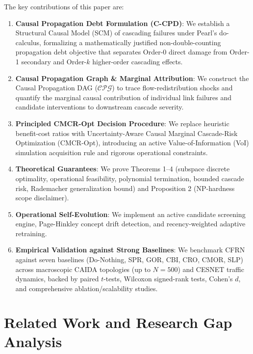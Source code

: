 \documentclass[pdflatex,sn-mathphys-num]{sn-jnl}
\theoremstyle{thmstyleone}
\theoremstyle{thmstyletwo}
\theoremstyle{thmstylethree}
\begin{document}
The key contributions of this paper are:
\begin{enumerate}
    \item \textbf{Causal Propagation Debt Formulation (C-CPD)}: We establish a Structural Causal Model (SCM) of cascading failures under Pearl's do-calculus, formalizing a mathematically justified non-double-counting propagation debt objective that separates Order-0 direct damage from Order-1 secondary and Order-$k$ higher-order cascading effects.
    \item \textbf{Causal Propagation Graph \& Marginal Attribution}: We construct the Causal Propagation DAG ($\mathcal{CPG}$) to trace flow-redistribution shocks and quantify the marginal causal contribution of individual link failures and candidate interventions to downstream cascade severity.
    \item \textbf{Principled CMCR-Opt Decision Procedure}: We replace heuristic benefit-cost ratios with Uncertainty-Aware Causal Marginal Cascade-Risk Optimization (CMCR-Opt), introducing an active Value-of-Information (VoI) simulation acquisition rule and rigorous operational constraints.
    \item \textbf{Theoretical Guarantees}: We prove Theorems 1--4 (subspace discrete optimality, operational feasibility, polynomial termination, bounded cascade risk, Rademacher generalization bound) and Proposition 2 (NP-hardness scope disclaimer).
    \item \textbf{Operational Self-Evolution}: We implement an active candidate screening engine, Page-Hinkley concept drift detection, and recency-weighted adaptive retraining.
    \item \textbf{Empirical Validation against Strong Baselines}: We benchmark CFRN against seven baselines (Do-Nothing, SPR, GOR, CBI, CRO, CMOR, SLP) across macroscopic CAIDA topologies (up to $N=500$) and CESNET traffic dynamics, backed by paired $t$-tests, Wilcoxon signed-rank tests, Cohen's $d$, and comprehensive ablation/scalability studies.
\end{enumerate}

\section{Related Work and Research Gap Analysis}\label{sec2}
\end{document}
